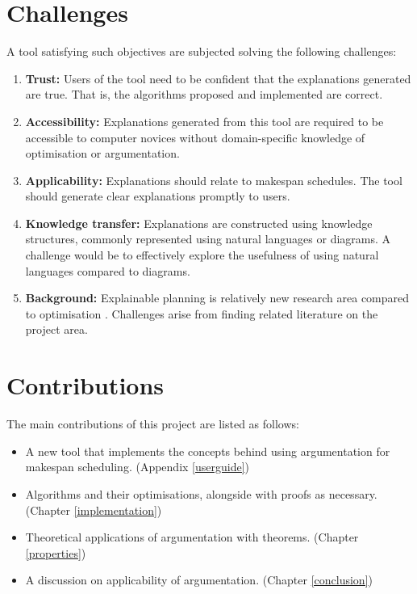 \section{Challenges}
\label{challenges}

A tool satisfying such objectives are subjected solving the following challenges:
\begin{enumerate}
	\item\textbf{Trust:} Users of the tool need to be confident that the explanations generated are true. That is, the algorithms proposed and implemented are correct.
	\item\textbf{Accessibility:} Explanations generated from this tool are required to be accessible to computer novices without domain-specific knowledge of optimisation or argumentation.
	\item\textbf{Applicability:} Explanations should relate to makespan schedules. The tool should generate clear explanations promptly to users.
	\item\textbf{Knowledge transfer:} Explanations are constructed using knowledge structures, commonly represented using natural languages or diagrams. A challenge would be to effectively explore the usefulness of using natural languages compared to diagrams.
	\item\textbf{Background:} Explainable planning is relatively new research area compared to optimisation \cite{pe}. Challenges arise from finding related literature on the project area.
\end{enumerate}

\section{Contributions}
\label{introcontributions}

The main contributions of this project are listed as follows:
\begin{itemize}
	\item A new tool \emph{\toolname} that implements the concepts behind using argumentation for makespan scheduling. (Appendix \ref{userguide})
	\item Algorithms and their optimisations, alongside with proofs as necessary. (Chapter \ref{implementation})
	\item Theoretical applications of argumentation with theorems. (Chapter \ref{properties})
	\item A discussion on applicability of argumentation. (Chapter \ref{conclusion})
\end{itemize}
